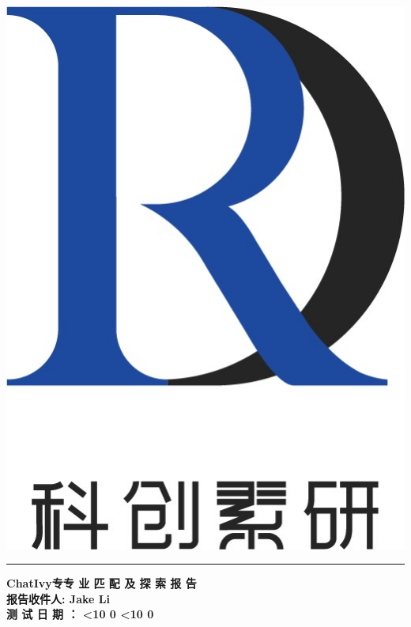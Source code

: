 \documentclass[12pt]{article}
\newcommand{\insertname}{
    Jake Li
}
\newcommand{\customdate}{
    \the\year年\hspace{0.5em}%
    \ifnum\month<10 0\fi\the\month月\hspace{0.5em}%
    \ifnum\day<10 0\fi\the\day日%
}
\begin{document}
\thispagestyle{empty} 
\begin{CJK*}{UTF8}{gbsn}

\noindent\hfill\begin{minipage}{2.0cm} %
   \includegraphics[width=\textwidth]{logo_.jpg}\\
\end{minipage}
\vspace{-3.7cm}

\noindent\textcolor{darkblue}{\rule{\textwidth}{5pt}} %

\vspace{10pt} %
{\noindent\Large\bfseries\hspace*{0.5cm}ChatIvy专专 业 匹 配 及 探 索 报 告}\\[12pt] %
{\noindent\large\bfseries\hspace*{0.5cm}报告收件人: \insertname}\\[10pt] %
{\noindent\large\bfseries\hspace*{0.5cm}测 试 日 期 ：\customdate}
\vspace{10pt} %


\end{CJK*}
\end{document}
